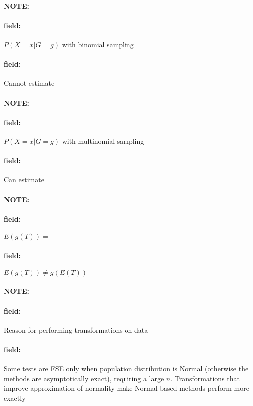 \documentclass[12pt]{article}
\newenvironment{note}{\paragraph{NOTE:}}{}
\newenvironment{field}{\paragraph{field:}}{}
\begin{document}
\begin{note}
 \begin{field}
  $P(X = x | G = g)$ with binomial sampling
 \end{field}
 \begin{field}
  Cannot estimate
 \end{field}
\end{note}

\begin{note}
 \begin{field}
  $P(X = x | G = g)$ with multinomial sampling
 \end{field}
 \begin{field}
  Can estimate
 \end{field}
\end{note}

\begin{note}
 \begin{field}
  $E(g(T)) = $
 \end{field}
 \begin{field}
  $E(g(T)) \neq g(E(T))$
 \end{field}
\end{note}


\begin{note}
 \begin{field}
  Reason for performing transformations on data
 \end{field}
 \begin{field}
  Some tests are FSE only when population distribution is Normal (otherwise the methods are asymptotically exact), requiring a large $n$. Transformations that improve approximation of normality make Normal-based methods perform more exactly
 \end{field}
\end{note}
\end{document}
